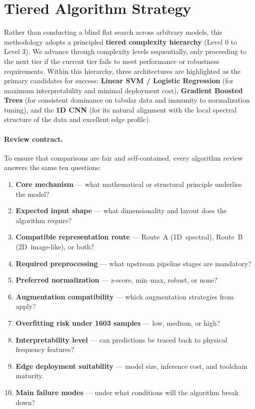 
\section{Tiered Algorithm Strategy}\label{sec:algorithms}

Rather than conducting a blind flat search across arbitrary models, this methodology
adopts a principled \textbf{tiered complexity hierarchy} (Level 0 to Level 3). We
advance through complexity levels sequentially, only proceeding to the next tier if
the current tier fails to meet performance or robustness requirements.
Within this hierarchy, three architectures are highlighted as the primary candidates
for success: \textbf{Linear SVM / Logistic Regression} (for maximum interpretability
and minimal deployment cost), \textbf{Gradient Boosted Trees} (for consistent dominance
on tabular data and immunity to normalization tuning), and the \textbf{1D CNN} (for its
natural alignment with the local spectral structure of the data and excellent edge profile).

\paragraph{Review contract.}
To ensure that comparisons are fair and self-contained, every algorithm
review answers the same ten questions:
%
\begin{enumerate}
  \item \textbf{Core mechanism} --- what mathematical or structural principle underlies the model?
  \item \textbf{Expected input shape} --- what dimensionality and layout does the algorithm require?
  \item \textbf{Compatible representation route} --- Route~A (1D~spectral), Route~B (2D~image-like), or both?
  \item \textbf{Required preprocessing} --- what upstream pipeline stages are mandatory?
  \item \textbf{Preferred normalization} --- z-score, min--max, robust, or none?
  \item \textbf{Augmentation compatibility} --- which augmentation strategies from  apply?
  \item \textbf{Overfitting risk under \num{1603} samples} --- low, medium, or high?
  \item \textbf{Interpretability level} --- can predictions be traced back to physical frequency features?
  \item \textbf{Edge deployment suitability} --- model size, inference cost, and toolchain maturity.
  \item \textbf{Main failure modes} --- under what conditions will the algorithm break down?
\end{enumerate}




